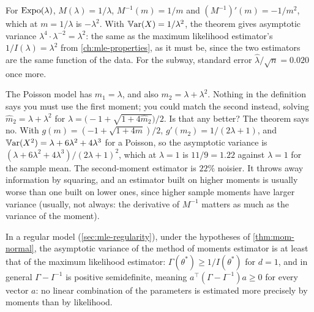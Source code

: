 \begin{worked}
For $\text{Expo}(\lambda)$, $M(\lambda) = 1/\lambda$, $M^{-1}(m) = 1/m$ and $(M^{-1})'(m) = -1/m^2$, which at $m = 1/\lambda$ is $-\lambda^2$.
With $\operatorname*{\mathbb{V}\text{ar}}(X) = 1/\lambda^2$, the theorem gives asymptotic variance $\lambda^4 \cdot \lambda^{-2} = \lambda^2$: the same as the maximum likelihood estimator's $1/I(\lambda) = \lambda^2$ from \cref{ch:mle-properties}, as it must be, since the two estimators are the same function of the data.
For the subway, standard error $\hat{\lambda}/\sqrt{n} = 0.020$ once more.
\end{worked}

\begin{sanitycheck}
The Poisson model has $m_1 = \lambda$, and also $m_2 = \lambda + \lambda^2$.
Nothing in the definition says you must use the first moment; you could match the second instead, solving $\hat{m}_2 = \lambda + \lambda^2$ for $\lambda = \big(-1 + \sqrt{1 + 4\hat{m}_2}\big)/2$.
Is that any better?
The theorem says no.
With $g(m) = (-1 + \sqrt{1 + 4m})/2$, $g'(m_2) = 1/(2\lambda + 1)$, and $\operatorname*{\mathbb{V}\text{ar}}(X^2) = \lambda + 6\lambda^2 + 4\lambda^3$ for a Poisson, so the asymptotic variance is $(\lambda + 6\lambda^2 + 4\lambda^3)/(2\lambda + 1)^2$, which at $\lambda = 1$ is $11/9 = 1.22$ against $\lambda = 1$ for the sample mean.
The second-moment estimator is $22\%$ noisier.
It throws away information by squaring, and an estimator built on higher moments is usually worse than one built on lower ones, since higher sample moments have larger variance (usually, not always: the derivative of $M^{-1}$ matters as much as the variance of the moment).
\end{sanitycheck}

\begin{proposition}
\label{prop:mom-vs-mle}
In a regular model (\cref{sec:mle-regularity}), under the hypotheses of \cref{thm:mom-normal}, the asymptotic variance of the method of moments estimator is at least that of the maximum likelihood estimator: $\Gamma(\theta^*) \geq 1/I(\theta^*)$ for $d = 1$, and in general $\Gamma - I^{-1}$ is positive semidefinite, meaning $a^\top(\Gamma - I^{-1})a \geq 0$ for every vector $a$: no linear combination of the parameters is estimated more precisely by moments than by likelihood.
\end{proposition}

